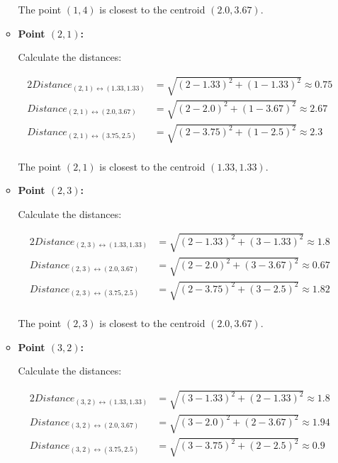 \documentclass[
english,
smallborders
]{i6prcsht}
\begin{document}
\begin{solution}
\begin{enumerate}
\begin{itemize}
			            The point $(1,4)$ is closest to the centroid $(2.0,3.67)$.

			      \item \textbf{Point $(2,1)$:}

			            Calculate the distances:

			            \begin{alignat*}{2}
				            Distance_{(2,1)\leftrightarrow(1.33,1.33)} & = \sqrt{(2-1.33)^2+(1-1.33)^2} \approx 0.75 \\
				            Distance_{(2,1)\leftrightarrow(2.0,3.67)}  & = \sqrt{(2-2.0)^2+(1-3.67)^2} \approx 2.67  \\
				            Distance_{(2,1)\leftrightarrow(3.75,2.5)}  & = \sqrt{(2-3.75)^2+(1-2.5)^2} \approx 2.3   \\
			            \end{alignat*}

			            The point $(2,1)$ is closest to the centroid $(1.33,1.33)$.

			      \item \textbf{Point $(2,3)$:}

			            Calculate the distances:

			            \begin{alignat*}{2}
				            Distance_{(2,3)\leftrightarrow(1.33,1.33)} & = \sqrt{(2-1.33)^2+(3-1.33)^2} \approx 1.8 \\
				            Distance_{(2,3)\leftrightarrow(2.0,3.67)}  & = \sqrt{(2-2.0)^2+(3-3.67)^2} \approx 0.67 \\
				            Distance_{(2,3)\leftrightarrow(3.75,2.5)}  & = \sqrt{(2-3.75)^2+(3-2.5)^2} \approx 1.82 \\
			            \end{alignat*}

			            The point $(2,3)$ is closest to the centroid $(2.0,3.67)$.

			      \item \textbf{Point $(3,2)$:}

			            Calculate the distances:

			            \begin{alignat*}{2}
				            Distance_{(3,2)\leftrightarrow(1.33,1.33)} & = \sqrt{(3-1.33)^2+(2-1.33)^2} \approx 1.8 \\
				            Distance_{(3,2)\leftrightarrow(2.0,3.67)}  & = \sqrt{(3-2.0)^2+(2-3.67)^2} \approx 1.94 \\
				            Distance_{(3,2)\leftrightarrow(3.75,2.5)}  & = \sqrt{(3-3.75)^2+(2-2.5)^2} \approx 0.9  \\
			            \end{alignat*}


\end{itemize}
\end{enumerate}
\end{solution}
\end{document}

